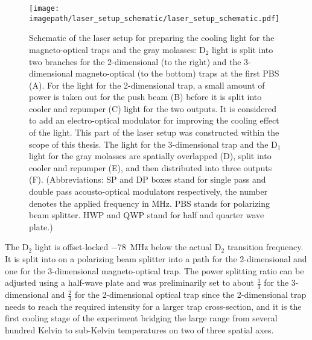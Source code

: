 \begin{figure}
    \centering
    \texttt{[image: \\imagepath/laser\_setup\_schematic/laser\_setup\_schematic.pdf]}
    \caption{Schematic of the laser setup for preparing the cooling light for the magneto-optical traps and the gray molasses: D$_2$ light is split into two branches for the 2-dimensional (to the right) and the 3-dimensional magneto-optical (to the bottom) traps at the first PBS (A).
    For the light for the 2-dimensional trap, a small amount of power is taken out for the push beam (B) before it is split into cooler and repumper (C) light for the two outputs. It is considered to add an electro-optical modulator for improving the cooling effect of the light. This part of the laser setup was constructed within the scope of this thesis.
    The light for the 3-dimensional trap and the D$_1$ light for the gray molasses are spatially overlapped (D), split into cooler and repumper (E), and then distributed into three outputs (F).
    (Abbreviations: SP and DP boxes stand for single pass and double pass acousto-optical modulators respectively, the number denotes the applied frequency in \si{\mega\hertz}. PBS stands for polarizing beam splitter. HWP and QWP stand for half and quarter wave plate.)
    }
    \label{fig:laser_setup_schematic}
\end{figure}

The D$_2$ light is offset-locked \SI{-78}{\mega\hertz} below the actual D$_2$ transition frequency. It is split into on a polarizing beam splitter into a path for the 2-dimensional and one for the 3-dimensional magneto-optical trap. The power splitting ratio can be adjusted using a half-wave plate and was preliminarily set to about $\frac{1}{3}$ for the 3-dimensional and $\frac{2}{3}$ for the 2-dimensional optical trap since the 2-dimensional trap needs to reach the required intensity for a larger trap cross-section, and it is the first cooling stage of the experiment bridging the large range from several hundred Kelvin to sub-Kelvin temperatures on two of three spatial axes.

